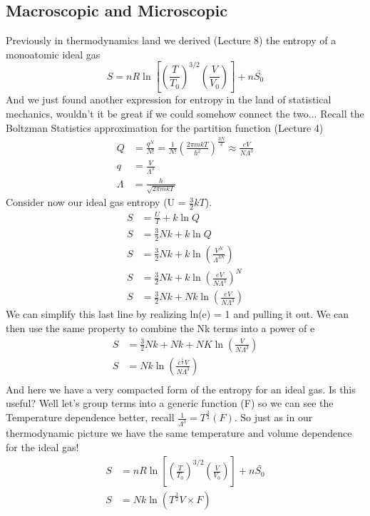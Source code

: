 \documentclass{article}
\begin{document}
\subsection*{Macroscopic and Microscopic}
Previously in thermodynamics land we derived (Lecture 8) the entropy of a monoatomic ideal gas
\begin{equation}
    S = nR\ln\left[ \left(\frac{T}{T_0} \right)^{3/2} \left(\frac{V}{V_0} \right) \right ] + n\bar{S_0}
\end{equation}
And we just found another expression for entropy in the land of statistical mechanics, wouldn't it be great if we could somehow connect the two...
Recall the Boltzman Statistics approximation for the partition function (Lecture 4)
\begin{equation}
\begin{split}
    Q &= \frac{q^N}{N!} = \frac{1}{N!} \left (\frac{2\pi mkT}{h^2}\right)^{\frac{3N}{2}} \approx \frac{eV}{N\Lambda^3}\\
    q &= \frac{V}{\Lambda^3} \\
    \Lambda &= \frac{h}{\sqrt{2\pi mkT}}
    \end{split}
\end{equation}
Consider now our ideal gas entropy (U = $\frac{3}{2}kT$). 
\begin{equation}
\begin{split}
    S &= \frac{U}{T} + k\ln Q \\ 
    S &= \frac{3}{2}Nk + k\ln Q \\
    S &= \frac{3}{2}Nk + k\ln \left(\frac{V^N}{\Lambda^{3N}}\right) \\
    S &= \frac{3}{2}Nk + k\ln \left(\frac{eV}{N\Lambda^{3}}\right)^N \\
    S &= \frac{3}{2}Nk + Nk\ln \left(\frac{eV}{N\Lambda^{3}}\right)
\end{split}
\end{equation}
We can simplify this last line by realizing ln(e) = 1 and pulling it out. 
We can then use the same property to combine the Nk terms into a power of e 
\begin{equation}
\begin{split}
S &= \frac{3}{2}Nk + Nk + NK\ln \left(\frac{V}{N\Lambda^{3}}\right) \\ 
S &= Nk\ln \left(\frac{e^{\frac{5}{2}}V}{N\Lambda^{3}}\right) \\ 
\end{split}
\end{equation}
And here we have a very compacted form of the entropy for an ideal gas. 
Is this useful?
Well let's group terms into a generic function (F) so we can see the Temperature dependence better, recall $\frac{1}{\Lambda^3} = T^{\frac{3}{2}}(F)$. 
So just as in our thermodynamic picture we have the same temperature and volume dependence for the ideal gas!
\begin{equation}
\begin{split}
    S &= nR\ln\left[ \left(\frac{T}{T_0} \right)^{3/2} \left(\frac{V}{V_0} \right) \right ] + n\bar{S_0} \\
    S &= Nk\ln \left( T^{\frac{3}{2}}V \times F \right)
\end{split}
\end{equation}
\end{document}
